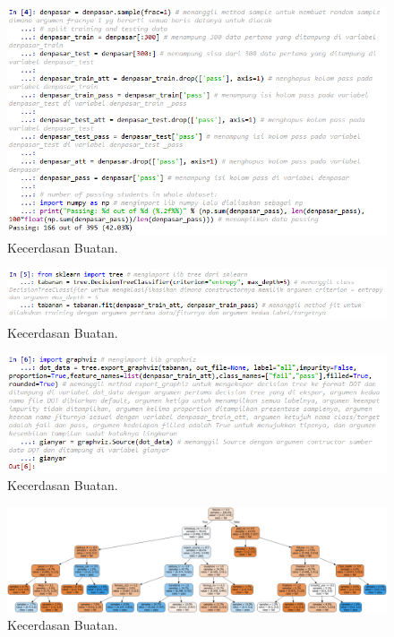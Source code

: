 
\hfill\break
\begin{figure}[H]
    \includegraphics[width=1\textwidth]{figures/1174006/chapter2/praktek/4.png}
    \centering
    \caption{Kecerdasan Buatan.}
\end{figure}


\hfill\break
\begin{figure}[H]
    \includegraphics[width=1\textwidth]{figures/1174006/chapter2/praktek/5.png}
    \centering
    \caption{Kecerdasan Buatan.}
\end{figure}


\hfill\break
\begin{figure}[H]
    \includegraphics[width=1\textwidth]{figures/1174006/chapter2/praktek/6-1.png}
    \centering
    \caption{Kecerdasan Buatan.}
\end{figure}
\hfill\break
\begin{figure}[H]
    \includegraphics[width=1\textwidth]{figures/1174006/chapter2/praktek/6-2.png}
    \centering
    \caption{Kecerdasan Buatan.}
\end{figure}

